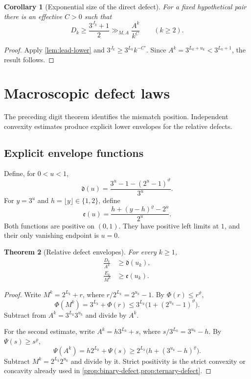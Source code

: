 \documentclass[11pt]{article}
\newtheorem{theorem}{Theorem}[section]
\newtheorem{corollary}[theorem]{Corollary}
\theoremstyle{definition}
\begin{document}
\begin{corollary}[Exponential size of the direct defect]\label{cor:D-from-J}
For a fixed hypothetical pair there is an effective \(C>0\) such that
\begin{equation}\label{eq:D-J-bound}
 D_k\ge\frac{3^{J_k}+1}{2}
      \gg_{M,A}\frac{A^k}{k^C}
 \qquad(k\ge2).
\end{equation}
\end{corollary}

\begin{proof}
Apply \cref{lem:lead-lower} and
\(3^{J_k}\ge3^{L_k}k^{-C'}\).  Since
\(A^k=3^{L_k+u_k}<3^{L_k+1}\), the result follows.
\end{proof}

\section{Macroscopic defect laws}
\label{sec:macro}

The preceding digit theorem identifies the mismatch position.  Independent
convexity estimates produce explicit lower envelopes for the relative
defects.

\subsection{Explicit envelope functions}

Define, for \(0<u<1\),
\begin{equation}\label{eq:d-envelope}
 \mathfrak d(u)
 =\frac{3^u-1-(2^u-1)^\vartheta}{3^u}.
\end{equation}
For \(y=3^u\) and \(h=\lfloor y\rfloor\in\{1,2\}\), define
\begin{equation}\label{eq:e-envelope}
 \mathfrak e(u)
 =\frac{h+(y-h)^\varrho-2^u}{2^u}.
\end{equation}
Both functions are positive on \((0,1)\).  They have positive left limits
at \(1\), and their only vanishing endpoint is \(u=0\).

\begin{theorem}[Relative defect envelopes]\label{thm:defect-envelopes}
For every \(k\ge1\),
\begin{align}
 \frac{D_k}{A^k}&\ge\mathfrak d(u_k),
 \label{eq:D-envelope}\\
 \frac{E_k}{M^k}&\ge\mathfrak e(u_k).
 \label{eq:E-envelope}
\end{align}
\end{theorem}

\begin{proof}
Write \(M^k=2^{L_k}+r\), where
\(r/2^{L_k}=2^{u_k}-1\).  By
\(\Phi(r)\le r^\vartheta\),
\[
 \Phi(M^k)
 =3^{L_k}+\Phi(r)
 \le3^{L_k}\bigl(1+(2^{u_k}-1)^\vartheta\bigr).
\]
Subtract from \(A^k=3^{L_k}3^{u_k}\) and divide by \(A^k\).

For the second estimate, write
\(A^k=h3^{L_k}+s\), where
\(s/3^{L_k}=3^{u_k}-h\).  By
\(\Psi(s)\ge s^\varrho\),
\[
 \Psi(A^k)
 =h2^{L_k}+\Psi(s)
 \ge2^{L_k}\bigl(h+(3^{u_k}-h)^\varrho\bigr).
\]
Subtract \(M^k=2^{L_k}2^{u_k}\) and divide by it.
Strict positivity is the strict convexity or concavity already used in
\cref{prop:binary-defect,prop:ternary-defect}.
\end{proof}
\end{document}
